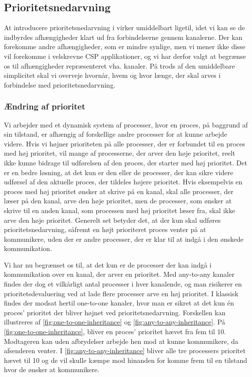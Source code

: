 \subsection{Prioritetsnedarvning}\label{sec:rtp-pycsp-nedarvning}
At introducere prioritetsnedarvning i \pycsp virker umiddelbart ligetil, idet vi kan se de indbyrdes afhængigheder klart ud fra forbindelserne gennem kanalerne. Der kan forekomme andre afhængigheder, som er mindre synlige, men vi mener ikke disse vil forekomme i velskrevne CSP applikationer, og vi har derfor valgt at begrænse os til afhængigheder repræsenteret vha. kanaler. På trods af den umiddelbare simplicitet skal vi overveje hvornår, hvem og hvor længe, der skal arves i forbindelse med prioritetsnedarvning.

\subsubsection*{Ændring af prioritet}
\label{sec:aendring-af-prioritet}
Vi arbejder med et dynamisk system af processer, hvor en proces, på baggrund af sin tilstand, er afhængig af forskellige andre processer for at kunne arbejde videre. 
Hvis vi højner prioriteten på alle processer, der er forbundet til en proces med høj prioritet, vil mange af processerne, der arver den høje prioritet, reelt ikke kunne bidrage til udførelsen af den proces, der starter med høj prioritet. Det er en bedre løsning, at det kun er den eller de processer, der kan sikre videre udførsel af den aktuelle proces, der tildeles højere prioritet. Hvis eksempelvis en proces med høj prioritet ønsker at skrive på en kanal, skal alle processer, der læser på den kanal, arve den høje prioritet, men de processer, som ønsker at skrive til en anden kanal, som processen med høj prioritet læser fra, skal ikke arve den høje prioritet. Generelt set betyder det, at der kun skal udføres prioritetsnedarvning, såfremt en højt prioriteret proces venter på at kommunikere, uden der er andre processer, der er klar til at indgå i den ønskede kommunikation. 

Vi har nu begrænset os til, at det kun er de processer der kan indgå i kommunikation over en kanal, der arver en prioritet. Med any-to-any kanaler findes der dog et vilkårligt antal processer i hver kanalende, og man risikerer en prioritetsdevaluering ved at lade flere processer arve en høj prioritet. I klassisk \csp findes der modsat hertil one-to-one kanaler, hvor man er sikret at det kun én proces' prioritet der bliver højnet ved prioritetsnedarvning. Forskellen kan illustreres af \autoref{fig:one-to-one-inheritance} og \cref{fig:any-to-any-inheritance}. På \autoref{fig:one-to-one-inheritance}, bliver en proces' prioritet hævet fra fem til 10. Modtageren kan uden afbrydelser arbejde hen mod at kunne kommunikere, da afsenderen venter. I \autoref{fig:any-to-any-inheritance} bliver alle tre processers prioritet hævet til 10 og de vil skulle kæmpe mod hinanden for komme frem til en tilstand hvor de ønsker at kommunikere. 

